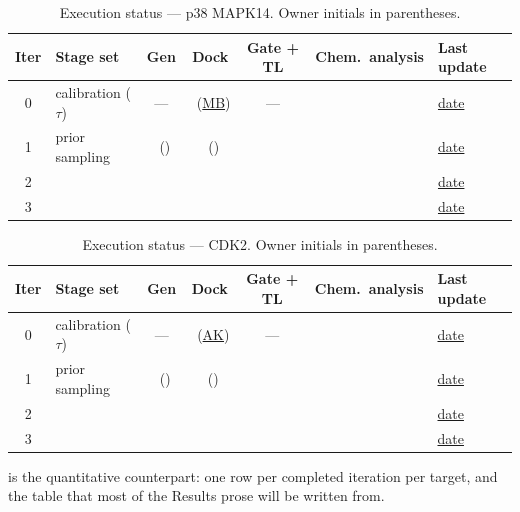 \documentclass[11pt]{article}
\newcommand{\FILL}[1]{\textcolor{blue!65!black}{\underline{\textsf{#1}}}}
\newcommand{\done}{\textcolor{green!55!black}{\ding{51}}}
\newcommand{\wip}{\textcolor{orange!90!black}{\ding{110}}}
\newcommand{\notstarted}{\textcolor{gray!70}{\ding{109}}}
\begin{document}
\begin{table}[h]
\centering
\caption{Execution status --- p38 MAPK14. Owner initials in parentheses.}
\label{tab:status-p38}
\small
\begin{tabular}{clccccl}
\toprule
Iter & Stage set & Gen & Dock & Gate + TL & Chem.\ analysis & Last update \\
\midrule
0 & calibration ($\tau$) & --- & \wip\ (\FILL{MB}) & --- & \notstarted & \FILL{date} \\
1 & prior sampling       & \done\ (\FILL{}) & \wip\ (\FILL{}) & \notstarted & \notstarted & \FILL{date} \\
2 & \FILL{}              & \notstarted & \notstarted & \notstarted & \notstarted & \FILL{date} \\
3 & \FILL{}              & \notstarted & \notstarted & \notstarted & \notstarted & \FILL{date} \\
\bottomrule
\end{tabular}
\end{table}

\begin{table}[h]
\centering
\caption{Execution status --- CDK2. Owner initials in parentheses.}
\label{tab:status-cdk2}
\small
\begin{tabular}{clccccl}
\toprule
Iter & Stage set & Gen & Dock & Gate + TL & Chem.\ analysis & Last update \\
\midrule
0 & calibration ($\tau$) & --- & \wip\ (\FILL{AK}) & --- & \notstarted & \FILL{date} \\
1 & prior sampling       & \done\ (\FILL{}) & \wip\ (\FILL{}) & \notstarted & \notstarted & \FILL{date} \\
2 & \FILL{}              & \notstarted & \notstarted & \notstarted & \notstarted & \FILL{date} \\
3 & \FILL{}              & \notstarted & \notstarted & \notstarted & \notstarted & \FILL{date} \\
\bottomrule
\end{tabular}
\end{table}

\noindent
{} is the quantitative counterpart: one row per completed
iteration per target, and the table that most of the Results prose will be
written from.
\end{document}
